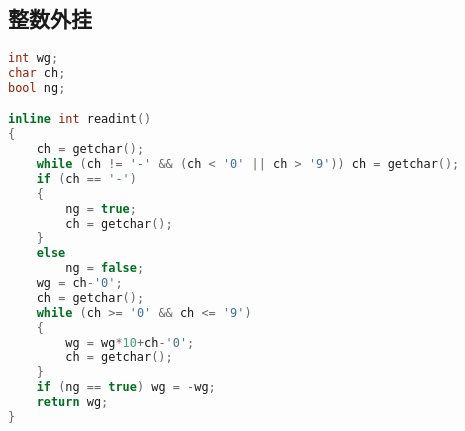 \subsection{整数外挂}
	\begin{lstlisting}[language=c++]
int wg;
char ch;
bool ng;

inline int readint()
{
	ch = getchar();
	while (ch != '-' && (ch < '0' || ch > '9')) ch = getchar();
	if (ch == '-')
	{
		ng = true;
		ch = getchar();
	}
	else
		ng = false;
	wg = ch-'0';
	ch = getchar();
	while (ch >= '0' && ch <= '9')
	{
		wg = wg*10+ch-'0';
		ch = getchar();
	}
	if (ng == true) wg = -wg;
	return wg;
}
	\end{lstlisting} 